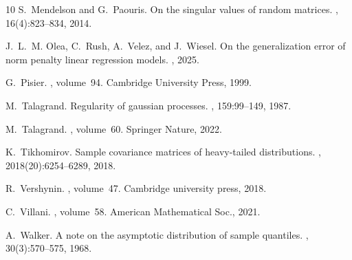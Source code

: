 \documentclass[11pt]{amsart}
\theoremstyle{definition}
\numberwithin{equation}{section}
\begin{document}
\begin{thebibliography}{10}
S.~Mendelson and G.~Paouris.
\newblock On the singular values of random matrices.
, 16(4):823--834,
  2014.

J.~L.~M. Olea, C.~Rush, A.~Velez, and J.~Wiesel.
\newblock On the generalization error of norm penalty linear regression models.
, 2025.

G.~Pisier.
,
  volume~94.
\newblock Cambridge University Press, 1999.

M.~Talagrand.
\newblock Regularity of gaussian processes.
, 159:99--149, 1987.

M.~Talagrand.
, volume~60.
\newblock Springer Nature, 2022.

K.~Tikhomirov.
\newblock Sample covariance matrices of heavy-tailed distributions.
,
  2018(20):6254--6289, 2018.

R.~Vershynin.
, volume~47.
\newblock Cambridge university press, 2018.

C.~Villani.
, volume~58.
\newblock American Mathematical Soc., 2021.

A.~Walker.
\newblock A note on the asymptotic distribution of sample quantiles.
, 30(3):570--575, 1968.

\end{thebibliography}
\end{document}
